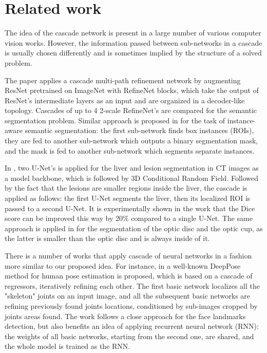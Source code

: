 \documentclass{llncs}
\begin{document}
\section{Related work}




The idea of the cascade network is present in a large number of  various computer vision works. However, the information passed between sub-networks in a cascade is usually chosen differently and is sometimes implied by the structure of a solved problem.


The paper \cite{lin2017refinenet} applies a cascade multi-path refinement network by augmenting ResNet \cite{resnet} pretrained on ImageNet \cite{imagenet} with RefineNet blocks, which take the output of ResNet’s intermediate layers as an input and are organized in a decoder-like topology. Cascades of up to 4 2-scale RefineNet's are compared for the semantic segmentation problem. %
Similar approach is proposed in \cite{dai2016instance} for the task of instance-aware semantic segmentation: the first sub-network finds box instances (ROIs), they are fed to another sub-network which outputs a binary segmentation mask, and the mask is fed to another sub-network which segments separate instances.
	
In \cite{christ2016automatic}, two U-Net’s is applied for the liver and lesion segmentation in CT images as a model backbone, which is followed by 3D Conditional Random Field. Followed by the fact that the lesions are smaller regions inside the liver, the cascade is applied as follows: the first U-Net segments the liver, then its localized ROI is passed to a second U-Net. It is experimentally shown in the work that the Dice score can be improved this way by 20\% compared to a single U-Net. The same approach is applied in \cite{sevastopolsky2017optic} for the segmentation of the optic disc and the optic cup, as the latter is smaller than the optic disc and is always inside of it.


There is a number of works that apply cascade of neural networks in a fashion more similar to our proposed idea. For instance, in \cite{toshev2014deeppose} a well-known DeepPose method for human pose estimation is proposed, which is based on a cascade of regressors, iteratively refining each other. The first basic network localizes all the "skeleton" joints on an input image, and all the subsequent basic networks are refining previously found joints locations, conditioned by sub-images cropped by joints areas found. The work \cite{trigeorgis2016mnemonic} follows a close approach for the face landmarks detection, but also benefits an idea of applying recurrent neural network (RNN): the weights of all basic networks, starting from the second one, are shared, and the whole model is trained as the RNN.
\end{document}
